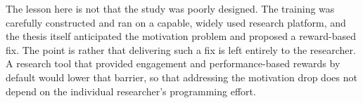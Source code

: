 The lesson here is not that the study was poorly designed. The training was carefully constructed and ran on a capable, widely used research platform, and the thesis itself anticipated the motivation problem and proposed a reward-based fix. The point is rather that delivering such a fix is left entirely to the researcher. A research tool that provided engagement and performance-based rewards by default would lower that barrier, so that addressing the motivation drop does not depend on the individual researcher's programming effort.
 

